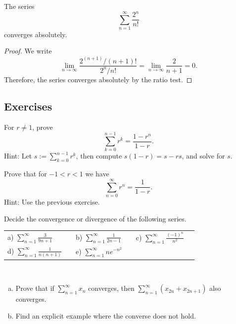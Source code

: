 \documentclass[12pt]{book}
\begin{document}
\begin{example}
The series
\begin{equation*}
\sum_{n=1}^\infty \frac{2^n}{n!}
\end{equation*}
converges absolutely.

\begin{proof}  We write
\begin{equation*}
\lim_{n\to\infty} \frac{2^{(n+1)}/(n+1)!}{2^n / n!} =
\lim_{n\to\infty} \frac{2}{n+1} = 0 .
\end{equation*}
Therefore, the series converges absolutely by the ratio test.
\end{proof}
\end{example}

\subsection*{Exercises}

\begin{exercise}
For $r \not= 1$, prove
\begin{equation*}
\sum_{k=0}^{n-1} r^k = \frac{1-r^n}{1-r} .
\end{equation*}
Hint:
Let $s := \sum_{k=0}^{n-1} r^k$, then
compute $s(1-r) = s-rs$, and solve for $s$.
\end{exercise}

\begin{exercise} \label{geometric:exr}
Prove that for $-1 < r < 1$ we have
\begin{equation*}
\sum_{n=0}^\infty r^n = \frac{1}{1-r} .
\end{equation*}
Hint:  Use the previous exercise.
\end{exercise}

\begin{exercise}
Decide the convergence or divergence of the following series.

\medskip

\noindent
\begin{tabular}{llllll}
a)
$\displaystyle \sum_{n=1}^\infty \frac{3}{9n+1}$
& &
b)
$\displaystyle \sum_{n=1}^\infty \frac{1}{2n-1}$
& &
c)
$\displaystyle \sum_{n=1}^\infty \frac{{(-1)}^n}{n^2}$
\\
d)
$\displaystyle \sum_{n=1}^\infty \frac{1}{n(n+1)}$
& &
e)
$\displaystyle \sum_{n=1}^\infty n e^{-n^2}$
\end{tabular}
\end{exercise}

\begin{exercise}
{\ }
\begin{enumerate}[a)]
\item Prove that if
$\displaystyle
\sum_{n=1}^\infty x_n
$
converges, then
$\displaystyle
\sum_{n=1}^\infty ( x_{2n} + x_{2n+1} )
$
also converges.
\item
Find an explicit example where the converse does not hold.
\end{enumerate}
\end{exercise}
\end{document}
